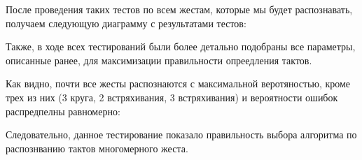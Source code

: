 После проведения таких тестов по всем жестам, которые мы будет распознавать, получаем следующую диаграмму с результатами тестов: \\

\begin{figure}[H]
\end{figure}

Также, в ходе всех тестирований были более детально подобраны все параметры, описанные ранее, для максимизации правильности опреедления тактов.

Как видно, почти все жесты распознаются с максимальной веротяностью, кроме трех из них (3 круга, 2 встряхивания, 3 встряхивания) и вероятности ошибок распредпелны равномерно:

\begin{figure}[H]
\end{figure}


Следовательно, данное тестирование показало правильность выбора алгоритма по распознванию тактов многомерного жеста.
